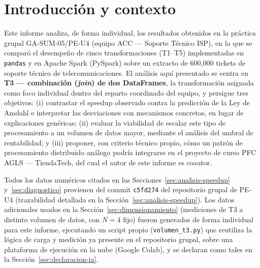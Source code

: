 \documentclass[11pt,a4paper]{article}
\begin{document}

    \section{Introducción y contexto}
    \label{sec:introduccion}

    Este informe analiza, de forma individual, los resultados obtenidos en
    la práctica grupal GA-SUM-05/PE-U4 (equipo ACC --- Soporte Técnico
    ISP), en la que se comparó el desempeño de cinco transformaciones
    (T1--T5) implementadas en \texttt{pandas} y en Apache Spark
    (PySpark) sobre un extracto de 600{,}000 tickets de soporte técnico de
    telecomunicaciones. El análisis aquí presentado se centra en
    \textbf{T3 --- combinación (\emph{join}) de dos DataFrames}, la
    transformación asignada como foco individual dentro del reparto
    coordinado del equipo, y persigue tres objetivos: (i) contrastar el
    speedup observado contra la predicción de la Ley de Amdahl e
    interpretar las desviaciones con mecanismos concretos, en lugar de
    explicaciones genéricas; (ii) evaluar la viabilidad de escalar este
    tipo de procesamiento a un volumen de datos mayor, mediante el
    análisis del umbral de rentabilidad; y (iii) proponer, con criterio
    técnico propio, cómo un patrón de procesamiento distribuido análogo
    podría integrarse en el proyecto de curso PFC AGLS --- TiendaTech, del
    cual el autor de este informe es coautor.

    Todos los datos numéricos citados en las Secciones~\ref{sec:analisis-speedup}
    y~\ref{sec:diagnostico} provienen del commit \texttt{c5fd274} del
    repositorio grupal de PE-U4 (trazabilidad detallada en la
    Sección~\ref{sec:analisis-speedup}). Los datos adicionales usados en
    la Sección~\ref{sec:dimensionamiento} (mediciones de T3 a distinto
    volumen de datos, con $N=4$ fijo) fueron generados de forma
    individual para este informe, ejecutando un script propio
    (\texttt{volumen\_t3.py}) que reutiliza la lógica de carga y medición
    ya presente en el repositorio grupal, sobre una plataforma de
    ejecución en la nube (Google Colab), y se declaran como tales en la
    Sección~\ref{sec:declaracion-ia}.


\end{document}
